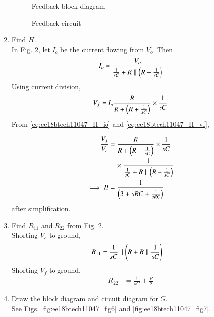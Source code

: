 \begin{enumerate}[label=\arabic*.,ref=\theenumi]
\renewcommand{\thefigure}{\theenumi.\arabic{figure}}
\begin{figure}[!ht]
	\begin{center}
		\resizebox{\columnwidth}{!}{}
	\end{center}
\caption{Feedback block diagram}
\label{fig:ee18btech11047_fig4}
\end{figure}
\begin{figure}[!ht]
	\begin{center}
		\resizebox{\columnwidth}{!}{}
	\end{center}
\caption{Feedback circuit}
\label{fig:ee18btech11047_fig5}
\end{figure}
\renewcommand{\thefigure}{\theenumi}
\item Find $H$.
\\
\solution In Fig. \ref{fig:ee18btech11047_fig5}, let $I_o$ be the current flowing from $V_o$.  Then
\begin{align}
\label{eq:ee18btech11047_H_io}
I_o = \frac{V_o}{\frac{1}{sC} + R \parallel \brak{R+\frac{1}{sC}}}
\end{align}
%
Using current division,
\begin{align}
\label{eq:ee18btech11047_H_vf}
V_f = I_o \frac{R}{R +  \brak{R+\frac{1}{sC}}} \times \frac{1}{sC}
\end{align}
From \eqref{eq:ee18btech11047_H_io} and \eqref{eq:ee18btech11047_H_vf},


\begin{align}
\frac{V_{f}}{V_{o}} &= \frac{R}{R +  \left(R+\frac{1}{sC}\right)} \times \frac{1}{sC} 
\nonumber \\
&\quad \times \frac{1}{\frac{1}{sC} + R \parallel \left(R+\frac{1}{sC}\right)}
\\
\implies H &= \frac{1}{\left(3+sRC +\frac{1}{sRC}\right)}
\end{align}
%
after simplification.
\item Find $R_{11}$ and $R_{22}$ from Fig. \ref{fig:ee18btech11047_fig5}. 
\\
\solution Shorting  $V_{o}$ to ground,
\begin{align}
R_{11} &= \frac{1}{sC} \parallel \brak{R+ R\parallel\frac{1}{sC}} 
\label{eq:ee18btech11047_6}
\end{align}
Shorting $V_{f}$ to ground,
\begin{align}
R_{22} &= \frac{1}{sC} + \frac{R}{2}   
\end{align}
%
\item Draw the block diagram and circuit diagram for $G$.\\
\solution See Figs. \ref{fig:ee18btech11047_fig6} and \ref{fig:ee18btech11047_fig7}.


\end{enumerate}
